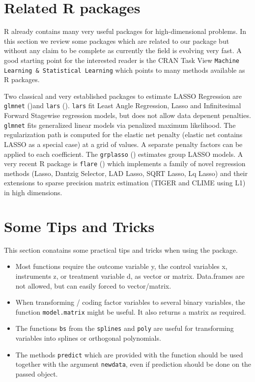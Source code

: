 \documentclass{amsart}
\newcommand{\Rpackage}[1]{{\texttt{#1}}}
\newcommand{\R}{{\normalfont\textsf{R }}{}}
\begin{document}
\section{Related \R packages}
\R already contains many very useful packages for high-dimensional problems. In this section we review some packages which are related to our package but without any claim to be complete as currently the field is evolving very fast. A good starting point for the interested reader is the CRAN Task View \texttt{Machine Learning \& Statistical Learning} which points to many methods available as \R packages.

Two classical and very established packages to estimate LASSO Regression are \Rpackage{glmnet} (\cite{glmnet})and \Rpackage{lars} (\cite{lars}).  \Rpackage{lars} fit Least Angle Regression, Lasso and Infinitesimal Forward Stagewise regression models, but does not allow data depenent penalties. \Rpackage{glmnet} fits generalized linear models via penalized maximum likelihood. The regularization path is computed for the elastic net penalty (elastic net contains LASSO as a special case) at a grid of values. A separate penalty factors can be applied to each coefficient. The \Rpackage{grplasso} (\cite{grplasso}) estimates group LASSO models. A very recent \R package is \Rpackage{flare} (\cite{flare}) which implements a family of novel regression methods (Lasso, Dantzig Selector, LAD Lasso, SQRT Lasso, Lq Lasso) and their extensions to sparse precision matrix estimation (TIGER and CLIME using L1) in high dimensions.


\section{Some Tips and Tricks}
This section conatains some practical tips and tricks when using the package.

\begin{itemize}
 \item Most functions require the outcome variable y, the control variables x, instruments z, or treatment variable d, as vector or matrix. Data.frames are not allowed, but can easily forced to vector/matrix.
 \item When transforming / coding factor variables to several binary variables, the function \texttt{model.matrix} might be useful. It also returns a matrix as required.
 \item The functions  \texttt{bs} from the \Rpackage{splines} and \texttt{poly} are useful for transforming variables into splines or orthogonal polynomials.
 \item The methods \texttt{predict} which are provided with the function should be used together with the argument \texttt{newdata}, even if prediction should be done on the passed object.
\end{itemize}
\end{document}
